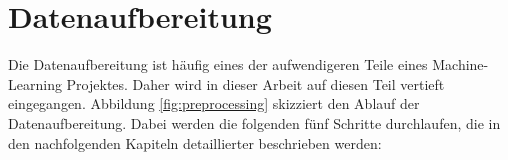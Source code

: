 \documentclass[
12pt, %
toc=listofnumbered, %
toc=chapterentrydotfill, %
numbers=noenddot, %
captions=tableheading, %
bibliography=numbered
]{scrreprt}
\let\Oldsection\section
\renewcommand{\section}{\FloatBarrier\Oldsection}
\newcommand{\highlight}[1]{\textbf{\textcolor{red}{#1}}}
\begin{document}



\section{Datenaufbereitung}\label{section:Datenaufbereitung}
Die Datenaufbereitung ist häufig eines der aufwendigeren Teile eines Machine-Learning Projektes. Daher wird in dieser Arbeit auf diesen Teil vertieft eingegangen. Abbildung \ref{fig:preprocessing} skizziert den Ablauf der Datenaufbereitung. Dabei werden die folgenden fünf Schritte durchlaufen, die in den nachfolgenden Kapiteln detaillierter beschrieben werden:
\end{document}
